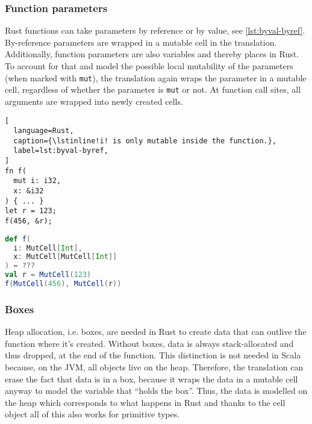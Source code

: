 \subsubsection{Function parameters}

Rust functions can take parameters by reference or by value, see
\autoref{lst:byval-byref}. By-reference parameters are wrapped in a mutable cell
in the translation. Additionally, function parameters are also variables and
thereby places in Rust. To account for that and model the possible local
mutability of the parameters (when marked with \lstinline!mut!), the translation
again wraps the parameter in a mutable cell, regardless of whether the parameter
is \lstinline!mut! or not. At function call sites, all arguments are wrapped
into newly created cells.

\noindent\begin{minipage}[t]{.48\textwidth}
\begin{lstlisting}[
  language=Rust,
  caption={\lstinline!i! is only mutable inside the function.},
  label=lst:byval-byref,
]
fn f(
  mut i: i32,
  x: &i32
) { ... }
let r = 123;
f(456, &r);
\end{lstlisting}
\end{minipage}\hfill
\begin{minipage}[t]{.48\textwidth}
\begin{lstlisting}[language=Scala, caption={This results in nested cell in Scala.}]
def f(
  i: MutCell[Int],
  x: MutCell[MutCell[Int]]
) = ???
val r = MutCell(123)
f(MutCell(456), MutCell(r))
\end{lstlisting}
\end{minipage}

\subsubsection{Boxes}

Heap allocation, i.e. boxes, are needed in Rust to create data that can outlive
the function where it's created. Without boxes, data is always stack-allocated
and thus dropped, at the end of the function. This distinction is not needed in
Scala because, on the JVM, all objects live on the heap. Therefore, the
translation can erase the fact that data is in a box, because it wraps the data
in a mutable cell anyway to model the variable that ``holds the box''. Thus,
the data  is modelled on the heap which corresponds to what happens in Rust and
thanks to the cell object all of this also works for primitive types.

